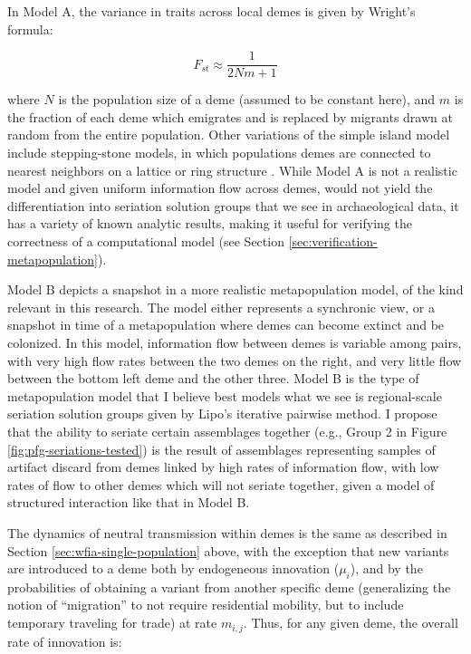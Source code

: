 In Model A, the variance in traits across local demes is given by Wright's formula:

\begin{equation}
\label{eq:wright-island-fst}
F_{st} \approx \frac{1}{2Nm + 1}
\end{equation}

where $N$ is the population size of a deme (assumed to be constant here), and $m$ is the fraction of each deme which emigrates and is replaced by migrants drawn at random from the entire population.  Other variations of the simple island model include stepping-stone models, in which populations demes are connected to nearest neighbors on a lattice or ring structure \cite[e.g. ][]{kimura1964number,kimura1964stepping,weiss1965mathematical,kimura1968genetic,kimura1971pattern,maruyama1980genetic}.  While Model A is not a realistic model and given uniform information flow across demes, would not yield the differentiation into seriation solution groups that we see in archaeological data, it has a variety of known analytic results, making it useful for verifying the correctness of a computational model (see Section \ref{sec:verification-metapopulation}).  

Model B depicts a snapshot in a more realistic metapopulation model, of the kind relevant in this research.  The model either represents a synchronic view, or a snapshot in time of a metapopulation where demes can become extinct and be colonized.  In this model, information flow between demes is variable among pairs, with very high flow rates between the two demes on the right, and very little flow between the bottom left deme and the other three.  Model B is the type of metapopulation model that I believe best models what we see is regional-scale seriation solution groups given by Lipo's iterative pairwise method.  I propose that the ability to seriate certain assemblages together (e.g., Group 2 in Figure \ref{fig:pfg-seriations-tested}) is the result of assemblages representing samples of artifact discard from demes linked by high rates of information flow, with low rates of flow to other demes which will not seriate together, given a model of structured interaction like that in Model B.  

The dynamics of neutral transmission within demes is the same as described in Section \ref{sec:wfia-single-population} above, with the exception that new variants are introduced to a deme both by endogeneous innovation ($\mu_i$), and by the probabilities of obtaining a variant from another specific deme (generalizing the notion of ``migration'' to not require residential mobility, but to include temporary traveling for trade) at rate $m_{i,j}$.   Thus, for any given deme, the overall rate of innovation is:

